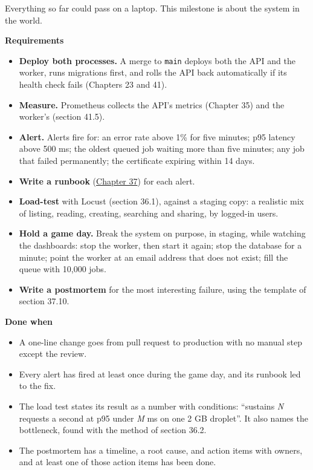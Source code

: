 Everything so far could pass on a laptop. This milestone is about the system in the world.

\textbf{Requirements}

\begin{itemize}
\tightlist
\item
  \textbf{Deploy both processes.} A merge to \texttt{main} deploys both the API and the worker, runs migrations first, and rolls the API back automatically if its health check fails (Chapters 23 and 41).
\item
  \textbf{Measure.} Prometheus collects the API's metrics (Chapter 35) and the worker's (section 41.5).
\item
  \textbf{Alert.} Alerts fire for: an error rate above 1\% for five minutes; p95 latency above 500 ms; the oldest queued job waiting more than five minutes; any job that failed permanently; the certificate expiring within 14 days.
\item
  \textbf{Write a runbook} (\hyperref[ch:37-reliability]{Chapter 37}) for each alert.
\item
  \textbf{Load-test} with Locust (section 36.1), against a staging copy: a realistic mix of listing, reading, creating, searching and sharing, by logged-in users.
\item
  \textbf{Hold a game day.} Break the system on purpose, in staging, while watching the dashboards: stop the worker, then start it again; stop the database for a minute; point the worker at an email address that does not exist; fill the queue with 10,000 jobs.
\item
  \textbf{Write a postmortem} for the most interesting failure, using the template of section 37.10.
\end{itemize}

\noindent{}\textbf{Done when}

\begin{itemize}
\item[$\square$]
  A one-line change goes from pull request to production with no manual step except the review.
\item[$\square$]
  Every alert has fired at least once during the game day, and its runbook led to the fix.
\item[$\square$]
  The load test states its result as a number with conditions: ``sustains \emph{N} requests a second at p95 under \emph{M} ms on one 2 GB droplet''. It also names the bottleneck, found with the method of section 36.2.
\item[$\square$]
  The postmortem has a timeline, a root cause, and action items with owners, and at least one of those action items has been done.
\end{itemize}

